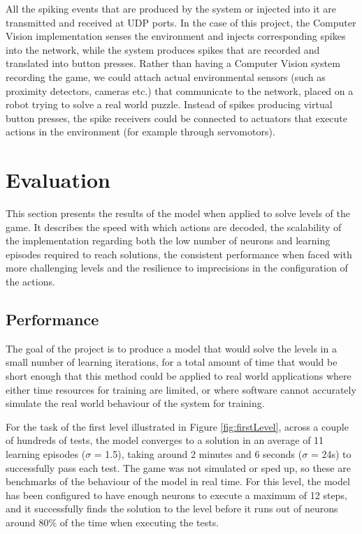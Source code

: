 \documentclass[10pt]{article}
\begin{document}
    All the spiking events that are produced by the system or injected into it are transmitted and received at UDP ports. In the case of this project, the Computer Vision implementation senses the environment and injects corresponding spikes into the network, while the system produces spikes that are recorded and translated into button presses. Rather than having a Computer Vision system recording the game, we could attach actual environmental sensors (such as proximity detectors, cameras etc.) that communicate to the network, placed on a robot trying to solve a real world puzzle. Instead of spikes producing virtual button presses, the spike receivers could be connected to actuators that execute actions in the environment (for example through servomotors).

    \section{Evaluation}

    This section presents the results of the model when applied to solve levels of the game. It describes the speed with which actions are decoded, the scalability of the implementation regarding both the low number of neurons and learning episodes required to reach solutions, the consistent performance when faced with more challenging levels and the resilience to imprecisions in the configuration of the actions.

    \subsection{Performance}
    
    The goal of the project is to produce a model that would solve the levels in a small number of learning iterations, for a total amount of time that would be short enough that this method could be applied to real world applications where either time resources for training are limited, or where software cannot accurately simulate the real world behaviour of the system for training.

    For the task of the first level illustrated in Figure \ref{fig:firstLevel}, across a couple of hundreds of tests, the model converges to a solution in an average of 11 learning episodes ($\sigma$ = 1.5), taking around 2 minutes and 6 seconds ($\sigma$ = 24s) to successfully pass each test. The game was not simulated or sped up, so these are benchmarks of the behaviour of the model in real time. For this level, the model has been configured to have enough neurons to execute a maximum of 12 steps, and it successfully finds the solution to the level before it runs out of neurons around 80\% of the time when executing the tests.
\end{document}
